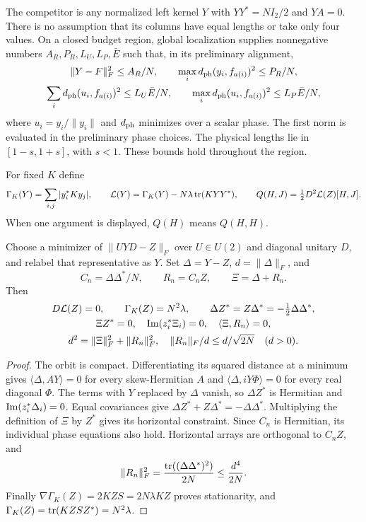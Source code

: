 The competitor is any normalized left kernel $Y$ with
$YY^*=NI_2/2$ and $YA=0$. There is no assumption that its columns have
equal lengths or take only four values. On a closed budget region,
global localization supplies nonnegative numbers $A_R,P_R,L_U,L_P,\bar E$
such that, in its preliminary alignment,
\begin{gather}
 \|Y-F\|_F^2\le A_R/N,\qquad
 \max_i d_{\rm ph}(y_i,f_{a(i)})^2\le P_R/N,
 \label{app:local:physical-input}\\
 \sum_i d_{\rm ph}(u_i,f_{a(i)})^2\le L_U\bar E/N,\qquad
 \max_i d_{\rm ph}(u_i,f_{a(i)})^2\le L_P\bar E/N,       \label{app:local:unit-input}
\end{gather}
where $u_i=y_i/\|y_i\|$ and $d_{\rm ph}$ minimizes over a scalar phase.
The first norm is evaluated in the preliminary phase choices.
The physical lengths lie in $[1-s,1+s]$, with $s<1$.
These bounds hold throughout the region.

For fixed $K$ define
\[
 \Gamma_K(Y)=\sum_{i,j}|y_i^*Ky_j|,\qquad
 \mathcal L(Y)=\Gamma_K(Y)-N\lambda\operatorname{tr}(KYY^*),\qquad
 Q(H,J)=\tfrac12D^2\mathcal L(Z)[H,J].
\]
When one argument is displayed, $Q(H)$ means $Q(H,H)$.

\begin{lemma}\label{app:local:gauge}
Choose a minimizer of $\|UYD-Z\|_F$ over $U\in U(2)$ and diagonal
unitary $D$, and relabel that representative as $Y$. Set
$\Delta=Y-Z$, $d=\|\Delta\|_F$, and
\[
 C_n=\Delta\Delta^*/N,\qquad R_n=C_nZ,\qquad \Xi=\Delta+R_n .
\]
Then
\begin{gather}
 D\mathcal L(Z)=0,\qquad \Gamma_K(Z)=N^2\lambda,\qquad
 \Delta Z^*=Z\Delta^*=-\tfrac12\Delta\Delta^*,            \label{app:local:gauge-id}\\
 \Xi Z^*=0,\quad \operatorname{Im}(z_i^*\Xi_i)=0,\quad
 \langle\Xi,R_n\rangle=0,\nonumber\\
 d^2=\|\Xi\|_F^2+\|R_n\|_F^2,\quad
 \|R_n\|_F/d\le d/\sqrt{2N}\quad(d>0).                 \label{app:local:normal-id}
\end{gather}
\end{lemma}
\begin{proof}
The orbit is compact. Differentiating its squared distance at a minimum
gives $\langle\Delta,AY\rangle=0$ for every skew-Hermitian $A$ and
$\langle\Delta,iY\Phi\rangle=0$ for every real diagonal $\Phi$.
The terms with $Y$ replaced by $\Delta$ vanish, so $\Delta Z^*$ is
Hermitian and $\operatorname{Im}(z_i^*\Delta_i)=0$. Equal covariances give
$\Delta Z^*+Z\Delta^*=-\Delta\Delta^*$.
Multiplying the definition of $\Xi$ by $Z^*$ gives its horizontal
constraint. Since $C_n$ is Hermitian, its individual phase equations
also hold. Horizontal arrays are orthogonal to $C_nZ$, and
\[
 \|R_n\|_F^2=\frac{\operatorname{tr}((\Delta\Delta^*)^2)}{2N}
 \le\frac{d^4}{2N}.
\]
Finally $\nabla\Gamma_K(Z)=2KZS=2N\lambda KZ$ proves stationarity, and
$\Gamma_K(Z)=\operatorname{tr}(KZSZ^*)=N^2\lambda$.
\end{proof}

